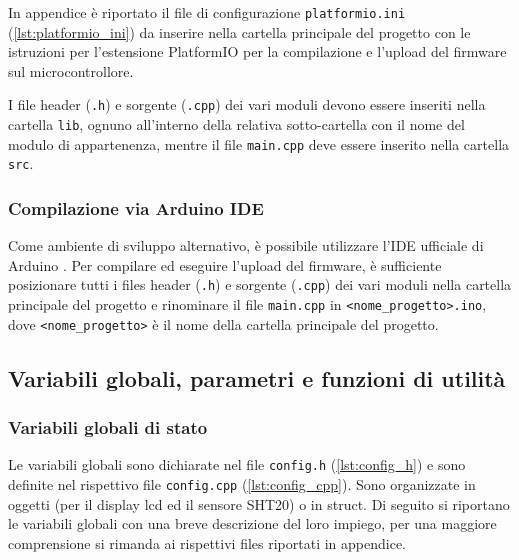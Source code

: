 In appendice è riportato il file di configurazione \verb|platformio.ini| (\autoref{lst:platformio_ini})
da inserire nella cartella principale del progetto con le istruzioni per l'estensione PlatformIO per la compilazione e
l'upload del firmware sul microcontrollore.

I file header (\verb|.h|) e sorgente (\verb|.cpp|) dei vari moduli devono essere inseriti nella cartella \verb|lib|, ognuno
all'interno della relativa sotto-cartella con il nome del modulo di appartenenza, mentre il file \verb|main.cpp| deve essere
inserito nella cartella \verb|src|.

\subsubsection{Compilazione via Arduino IDE}
Come ambiente di sviluppo alternativo, è possibile utilizzare l'IDE ufficiale di Arduino \cite{arduino_ide}. Per compilare
ed eseguire l'upload del firmware, è sufficiente posizionare tutti i files header (\verb|.h|) e sorgente (\verb|.cpp|) dei
vari moduli nella cartella principale del progetto e rinominare il file \verb|main.cpp| in \verb|<nome_progetto>.ino|, dove
\verb|<nome_progetto>| è il nome della cartella principale del progetto.

\subsection{Variabili globali, parametri e funzioni di utilità}
\subsubsection{Variabili globali di stato}
Le variabili globali sono dichiarate nel file \verb|config.h| (\autoref{lst:config_h}) e sono definite nel
rispettivo file \verb|config.cpp| (\autoref{lst:config_cpp}). Sono organizzate in oggetti (per il display lcd ed il sensore
SHT20) o in struct. Di seguito si riportano le variabili globali con una breve descrizione del loro impiego, per una maggiore
comprensione si rimanda ai rispettivi files riportati in appendice.

